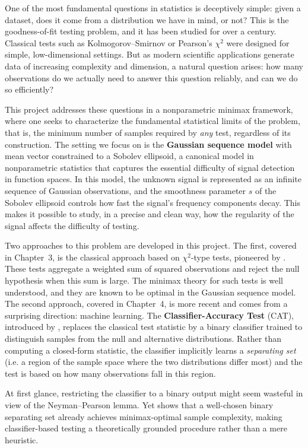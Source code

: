 One of the most fundamental questions in statistics is deceptively simple: given a dataset,
does it come from a distribution we have in mind, or not? This is the goodness-of-fit
testing problem, and it has been studied for over a century. Classical tests such as
Kolmogorov--Smirnov or Pearson's $\chi^2$ were designed for simple, low-dimensional
settings. But as modern scientific applications generate data of increasing complexity and
dimension, a natural question arises: how many observations do we actually need to answer
this question reliably, and can we do so efficiently?

This project addresses these questions in a nonparametric minimax framework, where one
seeks to characterize the fundamental statistical limits of the problem, that is, the
minimum number of samples required by \emph{any} test, regardless of its construction.
The setting we focus on is the \textbf{Gaussian sequence model} with mean vector constrained
to a Sobolev ellipsoid, a canonical model in nonparametric statistics that captures the
essential difficulty of signal detection in function spaces. In this model, the unknown
signal is represented as an infinite sequence of Gaussian observations, and the smoothness
parameter $s$ of the Sobolev ellipsoid controls how fast the signal's frequency components
decay. This makes it possible to study, in a precise and clean way, how the regularity of
the signal affects the difficulty of testing.

Two approaches to this problem are developed in this project. The first, covered in
Chapter~3, is the classical approach based on $\chi^2$-type tests, pioneered by \cite{Ing2012}. These tests aggregate a weighted sum of squared
observations and reject the null hypothesis when this sum is large. The minimax theory
for such tests is well understood, and they are known to be optimal in the Gaussian
sequence model. The second approach, covered in Chapter~4, is more recent and comes from
a surprising direction: machine learning. The \textbf{Classifier-Accuracy Test} (CAT),
introduced by \cite{gerberclas}, replaces the classical test statistic by
a binary classifier trained to distinguish samples from the null and alternative
distributions. Rather than computing a closed-form statistic, the classifier implicitly
learns a \emph{separating set} (i.e. a region of the sample space where the two
distributions differ most) and the test is based on how many observations fall in
this region.

At first glance, restricting the classifier to a binary output might seem wasteful in
view of the Neyman--Pearson lemma. Yet \cite{gerberclas} shows that a well-chosen binary
separating set already achieves minimax-optimal sample complexity, making classifier-based
testing a theoretically grounded procedure rather than a mere heuristic.

